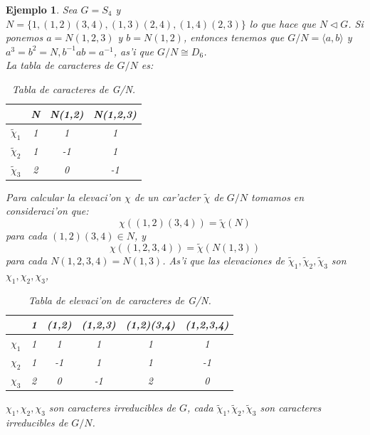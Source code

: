\documentclass[a4paper,openright,12pt]{book}
\numberwithin{equation}{section} %
\newtheorem{ejemplo}{Ejemplo}[section] %
\begin{document}
\begin{ejemplo}
Sea $G=S_{4}$ y $N=\{ 1,(1,2)(3,4), (1,3)(2,4), (1,4)(2,3) \} $ lo que hace que $N \triangleleft G$. Si ponemos $a=N(1, 2,3)$ y $b=N(1,2)$, entonces tenemos que $G/N=\langle a, b \rangle$ y $a^{3}=b^{2}=N, b^{-1}ab=a^{-1}$, as'i que $G/N  \cong D_{6}$.\\
La tabla de caracteres de $G/N$ es:
\begin{table}[H]
\begin{center}
\begin{tabular}{|c|c|c|c|}
\hline
& N & N(1,2) & N(1,2,3) \\
\hline \hline
$\tilde \chi_{1}$ & 1 & 1 & 1 \\ 
$\tilde \chi_{2}$ & 1 & -1 & 1 \\ 
$\tilde \chi_{3}$ & 2 & 0 & -1 \\ 
\hline
\end{tabular}
\caption{Tabla de caracteres de G/N.}
\label{tabla:caracteresG/N}
\end{center}
\end{table}
Para calcular la elevaci'on $\chi$ de un car'acter $\tilde \chi$ de $G/N$ tomamos en consideraci'on que:
\[
\chi ((1,2)(3,4))= \tilde \chi (N)
\]
para cada $(1,2)(3,4) \in N$, y
\[
\chi ((1,2,3,4)) = \tilde \chi (N(1,3))
\]
para cada $N(1,2,3,4)=N(1,3)$. As'i que las elevaciones de $\tilde \chi_{1}, \tilde \chi_{2}, \tilde \chi_{3}$ son $\chi_{1}, \chi_{2}, \chi_{3}$,
\begin{table}[H]
\begin{center}
\begin{tabular}{|c|c|c|c|c|c|}
\hline
& 1 & (1,2) & (1,2,3) & (1,2)(3,4) & (1,2,3,4)\\
\hline \hline
$\chi_{1}$ & 1 & 1 & 1 & 1 & 1 \\ 
$\chi_{2}$ & 1 & -1 & 1 & 1 & -1 \\ 
$\chi_{3}$ & 2 & 0 & -1 & 2 & 0\\ 
\hline
\end{tabular}
\caption{Tabla de elevaci'on de caracteres de G/N.}
\label{tabla:elevacioncaracteresG/N}
\end{center}
\end{table}
$\chi_{1}, \chi_{2}, \chi_{3}$ son caracteres irreducibles de $G$, cada $\tilde \chi_{1}, \tilde \chi_{2}, \tilde \chi_{3}$ son caracteres irreducibles de $G/N$.
\end{ejemplo}
\end{document}
